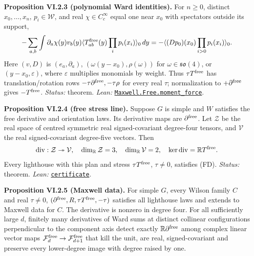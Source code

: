 \documentclass[
  letterpaper,
  11pt]{article}
\begin{document}
\textbf{Proposition VI.2.3 (polynomial Ward identities).} For \(n\ge0\),
distinct \(x_0,\ldots,x_n\), \(p_i\in\mathcal W\), and real
\(\chi\in C_c^\infty\) equal one near \(x_0\) with spectators outside
its support,
\[-\sum_{a,b}\int\partial_a\chi(y)v_b(y)\langle T^{\rm free}_{ab}(y)\prod_i p_i(x_i)\rangle_0\,dy=-\langle(Dp_0)(x_0)\prod_{i>0}p_i(x_i)\rangle_0.\]
Here \((v,D)\) is \((e_a,\partial_a)\), \((\omega(y-x_0),\rho(\omega))\)
for \(\omega\in\mathfrak{so}(4)\), or \((y-x_0,\varepsilon)\), where
\(\varepsilon\) multiplies monomials by weight. Thus
\(\tau T^{\rm free}\) has translation/rotation rows
\(-\tau\partial^{\rm free},-\tau\rho\) for every real \(\tau\);
normalization to \(+\partial^{\rm free}\) gives \(-T^{\rm free}\).
\emph{Status:} theorem. \emph{Lean:}
\href{https://github.com/yang-mills-group/OpenAI-YM-20261028/blob/3456e5e75cf8d4cd558955a5c7638fba2d68f464/YM/Next/MAXWELL/Taxes.lean\#L177-L200}{\texttt{Maxwell.Free.moment\_force}}.

\textbf{Proposition VI.2.4 (free stress line).} Suppose \(G\) is simple
and \(W\) satisfies the free derivative and orientation laws. Its
derivative maps are \(\partial^{\rm free}\). Let \(\mathcal Z\) be the
real space of centred symmetric real signed-covariant degree-four
tensors, and \(\mathcal V\) the real signed-covariant degree-five
vectors. Then
\[\mathrm{div}:\mathcal Z\twoheadrightarrow\mathcal V,\quad\dim_{\mathbb R}\mathcal Z=3,\quad\dim_{\mathbb R}\mathcal V=2,\quad\ker\mathrm{div}=\mathbb RT^{\rm free}.\]
Every lighthouse with this plan and stress \(\tau T^{\rm free}\),
\(\tau\ne0\), satisfies (FD). \emph{Status:} theorem. \emph{Lean:}
\href{https://github.com/yang-mills-group/OpenAI-YM-20261028/blob/3456e5e75cf8d4cd558955a5c7638fba2d68f464/YM/UVNext/FREE_STRESS_CERTIFICATE/Certificate.lean\#L125-L132}{\texttt{certificate}}.

\textbf{Proposition VI.2.5 (Maxwell data).} For simple \(G\), every
Wilson family \(C\) and real \(\tau\ne0\),
\((\partial^{\rm free},R,\tau T^{\rm free},-\tau)\) satisfies all
lighthouse laws and extends to Maxwell data for \(C\). The derivative is
nonzero in degree four. For all sufficiently large \(d\), finitely many
derivatives of Ward sums at distinct collinear configurations
perpendicular to the component axis detect exactly
\(\mathbb R\partial^{\rm free}\) among complex linear vector maps
\(\mathcal F_d^{\rm free}\to\mathcal F_{d+1}^{\rm free}\) that kill the
unit, are real, signed-covariant and preserve every lower-degree image
with degree raised by one.
\end{document}
